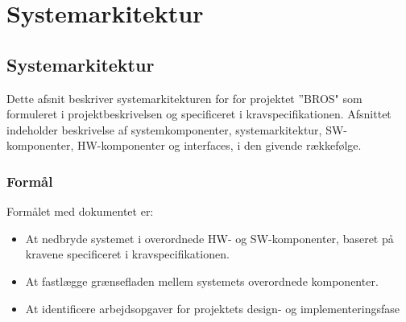 \chapter{Systemarkitektur}
\section{Systemarkitektur}
Dette afsnit beskriver systemarkitekturen for for projektet ”BROS" som formuleret i projektbeskrivelsen og specificeret i kravspecifikationen.
Afsnittet indeholder beskrivelse af systemkomponenter, systemarkitektur, SW-komponenter, HW-komponenter og interfaces, i den givende rækkefølge.

\subsection{Formål}
Formålet med dokumentet er:
\begin{itemize}
\item At nedbryde systemet i overordnede HW- og SW-komponenter, baseret på kravene specificeret i kravspecifikationen.
\item At fastlægge grænsefladen mellem systemets overordnede komponenter.
\item At identificere arbejdsopgaver for projektets design- og implementeringsfase
\end{itemize}

